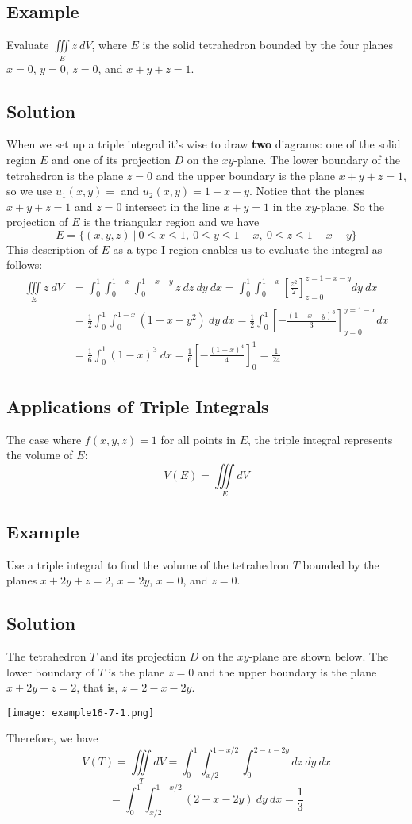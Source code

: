 \subsection*{Example}
Evaluate $\iiint\limits_E z\:dV$, where $E$ is the solid tetrahedron bounded by the
four planes $x=0$, $y=0$, $z=0$, and $x+y+z=1$.

\subsection*{Solution}
When we set up a triple integral it's wise to draw \textbf{two} diagrams: one of the
solid region $E$ and one of its projection $D$ on the $xy$-plane. The lower boundary
of the tetrahedron is the plane $z=0$ and the upper boundary is the plane $x+y+z=1$,
so we use $u_1(x,y)=$ and $u_2(x,y)=1-x-y$. Notice that the planes $x+y+z=1$ and $z=0$
intersect in the line $x+y=1$ in the $xy$-plane. So the projection of $E$ is the triangular
region and we have
$$E=\{(x,y,z)\:|\:0\leq x\leq 1,\:0\leq y\leq 1-x,\:0\leq z\leq 1-x-y\}$$
This description of $E$ as a type I region enables us to evaluate the integral as follows:
\begin{align*}
    \iiint\limits_E z\:dV & =\int_0^1\int_0^{1-x}\int_0^{1-x-y}z\:dz\:dy\:dx=\int_0^1\int_0^{1-x}\left[\frac{z^2}{2}\right]_{z=0}^{z=1-x-y}dy\:dx  \\
                          & =\frac{1}{2}\int_0^1\int_0^{1-x}(1-x-y^2)\:dy\:dx=\frac{1}{2}\int_0^1\left[-\frac{(1-x-y)^3}{3}\right]_{y=0}^{y=1-x}dx \\
                          & =\frac{1}{6}\int_0^1(1-x)^3\:dx=\frac{1}{6}\left[-\frac{(1-x)^4}{4}\right]_0^1=\frac{1}{24}
\end{align*}

\subsection*{Applications of Triple Integrals}
The case where $f(x,y,z)=1$ for all points in $E$, the triple integral represents the volume of $E$:
$$V(E)=\iiint\limits_E dV$$

\subsection*{Example}
Use a triple integral to find the volume of the tetrahedron $T$ bounded by the planes
$x+2y+z=2$, $x=2y$, $x=0$, and $z=0$.

\subsection*{Solution}
The tetrahedron $T$ and its projection $D$ on the $xy$-plane are shown below. The
lower boundary of $T$ is the plane $z=0$ and the upper boundary is the plane $x+2y+z=2$,
that is, $z=2-x-2y$.
\begin{center}
    \texttt{[image: example16-7-1.png]}
\end{center}
Therefore, we have
$$V(T)=\iiint\limits_T dV=\int_0^1\int_{x/2}^{1-x/2}\int_0^{2-x-2y}dz\:dy\:dx$$
$$=\int_0^1\int_{x/2}^{1-x/2}(2-x-2y)\:dy\:dx=\frac{1}{3}$$

